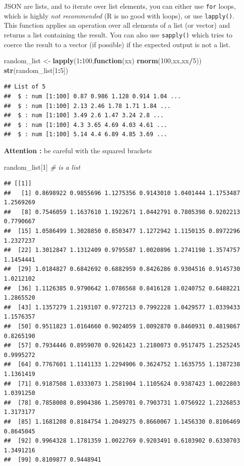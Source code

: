 \documentclass[
]{book}
\newenvironment{Shaded}{\begin{snugshade}}{\end{snugshade}}
\newcommand{\CommentTok}[1]{\textcolor[rgb]{0.56,0.35,0.01}{\textit{#1}}}
\newcommand{\ControlFlowTok}[1]{\textcolor[rgb]{0.13,0.29,0.53}{\textbf{#1}}}
\newcommand{\DecValTok}[1]{\textcolor[rgb]{0.00,0.00,0.81}{#1}}
\newcommand{\KeywordTok}[1]{\textcolor[rgb]{0.13,0.29,0.53}{\textbf{#1}}}
\newcommand{\NormalTok}[1]{#1}
\newcommand{\OperatorTok}[1]{\textcolor[rgb]{0.81,0.36,0.00}{\textbf{#1}}}
\newcommand{\StringTok}[1]{\textcolor[rgb]{0.31,0.60,0.02}{#1}}
\begin{document}
JSON are lists, and to iterate over list elements, you can either use \texttt{for} loops, which is highly \emph{not recommended} (R is no good with loops), or use \texttt{lapply()}. This function applies an operation over all elements of a list (or vector) and returns a list containing the result. You can also use \texttt{sapply()} which tries to coerce the result to a vector (if possible) if the expected output is not a list.

\begin{Shaded}
\begin{Highlighting}[]
\NormalTok{random_list <-}\StringTok{ }\KeywordTok{lapply}\NormalTok{(}\DecValTok{1}\OperatorTok{:}\DecValTok{100}\NormalTok{,}\ControlFlowTok{function}\NormalTok{(xx) }\KeywordTok{rnorm}\NormalTok{(}\DecValTok{100}\NormalTok{,xx,xx}\OperatorTok{/}\DecValTok{5}\NormalTok{))}
\KeywordTok{str}\NormalTok{(random_list[}\DecValTok{1}\OperatorTok{:}\DecValTok{5}\NormalTok{])}
\end{Highlighting}
\end{Shaded}

\begin{verbatim}
## List of 5
##  $ : num [1:100] 0.87 0.986 1.128 0.914 1.04 ...
##  $ : num [1:100] 2.13 2.46 1.78 1.71 1.84 ...
##  $ : num [1:100] 3.49 2.6 1.47 3.24 2.8 ...
##  $ : num [1:100] 4.3 3.65 4.69 4.03 4.61 ...
##  $ : num [1:100] 5.14 4.4 6.89 4.85 3.69 ...
\end{verbatim}

\textbf{Attention :} be careful with the squared brackets

\begin{Shaded}
\begin{Highlighting}[]
\NormalTok{random_list[}\DecValTok{1}\NormalTok{] }\CommentTok{# is a list}
\end{Highlighting}
\end{Shaded}

\begin{verbatim}
## [[1]]
##   [1] 0.8698922 0.9855696 1.1275356 0.9143010 1.0401444 1.1753487 1.2569269
##   [8] 0.7546059 1.1637610 1.1922671 1.0442791 0.7805398 0.9202213 0.7790667
##  [15] 1.0586499 1.3028850 0.8503477 1.1272942 1.1150135 0.8972296 1.2327237
##  [22] 1.3012847 1.1312409 0.9795587 1.0020896 1.2741198 1.3574757 1.1454441
##  [29] 1.0184827 0.6842692 0.6882959 0.8426286 0.9304516 0.9145730 1.0212102
##  [36] 1.1126385 0.9790642 1.0786568 0.8416128 1.0240752 0.6488221 1.2865520
##  [43] 1.1357279 1.2193107 0.9727213 0.7992228 1.0429577 1.0339433 1.1576357
##  [50] 0.9511823 1.0164660 0.9024059 1.0092870 0.8460931 0.4819867 0.8265190
##  [57] 0.7934446 0.8959070 0.9261423 1.2180073 0.9517475 1.2525245 0.9995272
##  [64] 0.7767601 1.1141133 1.2294906 0.3624752 1.1635755 1.1387238 1.1361419
##  [71] 0.9187508 1.0333073 1.2581904 1.1105624 0.9387423 1.0022803 1.0391250
##  [78] 0.7858008 0.8904386 1.2509701 0.7903731 1.0756922 1.2326853 1.3173177
##  [85] 1.1681208 0.8184754 1.2049275 0.8660067 1.1456330 0.8106469 0.8645045
##  [92] 0.9964328 1.1781359 1.0022769 0.9203491 0.6103902 0.6330703 1.3491216
##  [99] 0.8109877 0.9448941
\end{verbatim}
\end{document}
